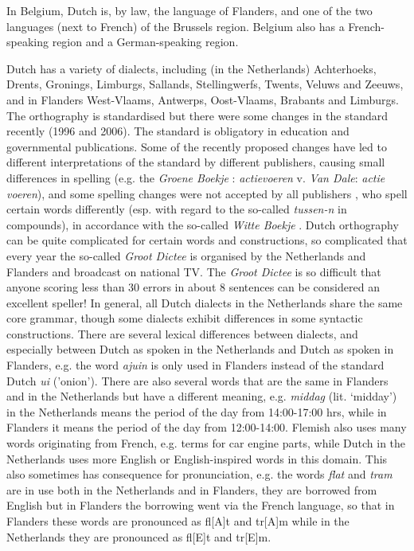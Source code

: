 \documentclass[]{../../metanetpaper}
\begin{document}
\begin{multicols}{2}
    In Belgium, Dutch is, by law, the language of Flanders, and one of the two languages (next to French) of the Brussels region.  Belgium also has a French-speaking region and a German-speaking region.

    Dutch has a variety of dialects, including (in the Netherlands) Achterhoeks, Drents, Gronings, Limburgs, Sallands, Stellingwerfs, Twents, Veluws and Zeeuws, and in Flanders West-Vlaams, Antwerps, Oost-Vlaams, Brabants and Limburgs. The orthography is standardised but there were some changes in the standard recently (1996 and 2006).  The standard is obligatory in education and governmental publications. Some of the recently proposed changes have led to different interpretations of the standard by different publishers, causing small differences in spelling (e.g.  the \emph{Groene Boekje} \cite{GroeneBoekje}: \emph{actievoeren} v. \emph{Van Dale}: \emph{actie voeren}), and some spelling changes were not accepted by all publishers \cite{Wittespellers}, who spell certain words differently (esp. with regard to the so-called \emph{tussen-n} in compounds), in accordance with the so-called \emph{Witte Boekje} \cite{Wittespelling}.  Dutch orthography can be quite complicated for certain words and constructions, so complicated that every year the so-called \emph{Groot Dictee} \cite{Grootdictee} is organised by the Netherlands and Flanders and broadcast on national TV. The \emph{Groot Dictee} is so difficult that anyone scoring less than 30 errors in about 8 sentences can be considered an excellent speller! In general, all Dutch dialects in the Netherlands share the same core grammar, though some dialects exhibit differences in some syntactic constructions. There are several  lexical differences between dialects, and especially between Dutch as spoken in the Netherlands and Dutch as spoken in Flanders, e.g. the word \emph{ajuin} is only used in Flanders instead of the standard Dutch \emph{ui} ('onion').  There are also several words that are the same in Flanders and in the Netherlands but have a different meaning, e.g. \emph{middag} (lit. `midday') in the Netherlands means the period of the day from 14:00-17:00 hrs, while in Flanders it means the period of the day from 12:00-14:00. Flemish also uses many words originating from French, e.g. terms for car engine parts, while Dutch in the Netherlands uses more English or English-inspired words in this domain. This also sometimes has consequence for pronunciation, e.g. the words \emph{flat} and \emph{tram} are in use both in the Netherlands and in Flanders, they are borrowed from English but in Flanders the borrowing went via the French language, so that in Flanders these words are pronounced as fl[A]t and tr[A]m while in the Netherlands they are pronounced as fl[E]t and tr[E]m.


\end{multicols}
\end{document}
